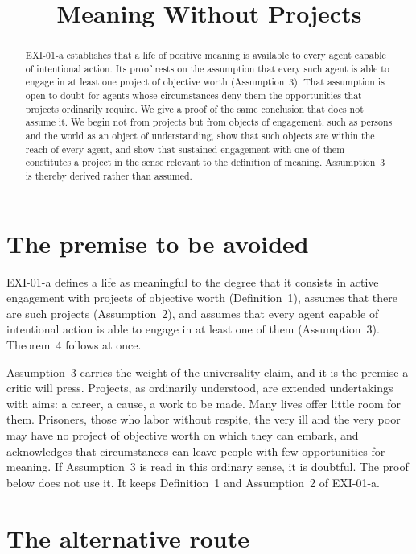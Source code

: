 \documentclass{situationist-preprint}
\title{Meaning Without Projects}
\begin{document}
\maketitle

\begin{abstract}
EXI-01-a establishes that a life of positive meaning is available to every agent capable of intentional action. Its proof rests on the assumption that every such agent is able to engage in at least one project of objective worth (Assumption~3). That assumption is open to doubt for agents whose circumstances deny them the opportunities that projects ordinarily require. We give a proof of the same conclusion that does not assume it. We begin not from projects but from objects of engagement, such as persons and the world as an object of understanding, show that such objects are within the reach of every agent, and show that sustained engagement with one of them constitutes a project in the sense relevant to the definition of meaning. Assumption~3 is thereby derived rather than assumed.
\end{abstract}

\section{The premise to be avoided}

EXI-01-a defines a life as meaningful to the degree that it consists in active engagement with projects of objective worth (Definition~1), assumes that there are such projects (Assumption~2), and assumes that every agent capable of intentional action is able to engage in at least one of them (Assumption~3). Theorem~4 follows at once.

Assumption~3 carries the weight of the universality claim, and it is the premise a critic will press. Projects, as ordinarily understood, are extended undertakings with aims: a career, a cause, a work to be made. Many lives offer little room for them. Prisoners, those who labor without respite, the very ill and the very poor may have no project of objective worth on which they can embark, and \citet{Wolf2010} acknowledges that circumstances can leave people with few opportunities for meaning. If Assumption~3 is read in this ordinary sense, it is doubtful. The proof below does not use it. It keeps Definition~1 and Assumption~2 of EXI-01-a.

\section{The alternative route}
\end{document}
